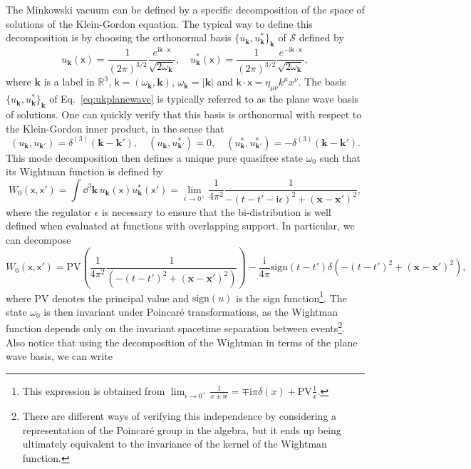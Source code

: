 \documentclass[letterpaper,12pt,titlepage,oneside,final]{book}
\renewcommand{\S}{\mathcal{S}}
\newcommand{\mf}{\mathsf}%
\newcommand{\ii}{\mathrm{i}}
\begin{document}
The Minkowski vacuum can be defined by a specific decomposition of the space of solutions of the Klein-Gordon equation. The typical way to define this decomposition is by choosing the orthonormal basis $\{u_{\bm k},u_{\bm k}^*\}_{\bm k}$ of $\S$ defined by
\begin{equation}\label{eq:ukplanewave}
    u_{\bm k}(\mf x) = \frac{1}{(2\pi)^{3/2}}\frac{e^{\ii \mf k \cdot \mf x}}{\sqrt{2 \omega_{\bm k}}}, \quad u_{\bm k}^*(\mf x) = \frac{1}{(2\pi)^{3/2}}\frac{e^{-\ii \mf k \cdot \mf x}}{\sqrt{2 \omega_{\bm k}}},
\end{equation}
where $\bm k$ is a label in $\mathbb{R}^3$, $\mf k = (\omega_{\bm k},\bm k)$, $\omega_{\bm k} = |\bm k|$ and $\mf k \cdot \mf x = \eta_{\mu\nu}k^\mu x^\nu$. The basis $\{u_{\bm k},u_{\bm k}^*\}_{\bm k}$ of Eq.~\eqref{eq:ukplanewave} is typically referred to as the plane wave basis of solutions. One can quickly verify that this basis is orthonormal with respect to the Klein-Gordon inner product, in the sense that 
\begin{equation}
    (u_{\bm k}, u_{\bm k'}) = \delta^{(3)}(\bm k - \bm k'), \quad (u_{\bm k},u_{\bm k'}^*) = 0, \quad (u_{\bm k}^*,u_{\bm k'}^*) = - \delta^{(3)}(\bm k - \bm k').
\end{equation}
This mode decomposition then defines a unique pure quasifree state $\omega_0$ such that its Wightman function is defined by
\begin{equation}\label{eq:W0}
    W_0(\mf x, \mf x') = \int\dd^3\bm k \,u_{\bm k}(\mf x) u_{\bm k}^*(\mf x') = \lim_{\epsilon\to0^+}\frac{1}{4\pi^2}\frac{1}{-(t-t' - \ii \epsilon)^2 + (\bm x - \bm x')^2},
\end{equation}
where the regulator $\epsilon$ is necessary to ensure that the bi-distribution is well defined when evaluated at functions with overlapping support. In particular, we can decompose
\begin{equation}
    W_0(\mf x, \mf x') = \text{PV} \left(\frac{1}{4\pi^2}\frac{1}{(-(t-t')^2 + (\bm x - \bm x')^2)}\right) - \frac{\ii }{4\pi} \text{sign}(t-t') \delta(-(t-t')^2 + (\bm x - \bm x')^2),
\end{equation}
where PV denotes the principal value and $\text{sign}(u)$ is the sign function\footnote{This expression is obtained from $\lim_{\epsilon\to 0^+} \frac{1}{x\pm \ii \epsilon} = \mp \ii \pi \delta(x) + \text{PV}\frac{1}{x}$.}. The state $\omega_0$ is then invariant under Poincar\'e transformations, as the Wightman function depends only on the invariant spacetime separation between events\footnote{There are different ways of verifying this independence by considering a representation of the Poincar\'e group in the algebra, but it ends up being ultimately equivalent to the invariance of the kernel of the Wightman function.}. Also notice that using the decomposition of the Wightman in terms of the plane wave basis, we can write
\end{document}
